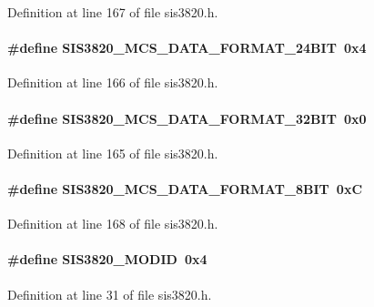 Definition at line 167 of file sis3820.h.
\paragraph[{SIS3820\_\-MCS\_\-DATA\_\-FORMAT\_\-24BIT}]{\setlength{\rightskip}{0pt plus 5cm}\#define SIS3820\_\-MCS\_\-DATA\_\-FORMAT\_\-24BIT~0x4}\hfill\label{sis3820_8h_a705e0893b268189b296f9a627473b006}


Definition at line 166 of file sis3820.h.
\paragraph[{SIS3820\_\-MCS\_\-DATA\_\-FORMAT\_\-32BIT}]{\setlength{\rightskip}{0pt plus 5cm}\#define SIS3820\_\-MCS\_\-DATA\_\-FORMAT\_\-32BIT~0x0}\hfill\label{sis3820_8h_aed2056b01f509efa255c9da7010480c1}


Definition at line 165 of file sis3820.h.
\paragraph[{SIS3820\_\-MCS\_\-DATA\_\-FORMAT\_\-8BIT}]{\setlength{\rightskip}{0pt plus 5cm}\#define SIS3820\_\-MCS\_\-DATA\_\-FORMAT\_\-8BIT~0xC}\hfill\label{sis3820_8h_a8f556820ba72a600cf97d54180b345f3}


Definition at line 168 of file sis3820.h.
\paragraph[{SIS3820\_\-MODID}]{\setlength{\rightskip}{0pt plus 5cm}\#define SIS3820\_\-MODID~0x4}\hfill\label{sis3820_8h_a56ba40d155d5ce25b6d43229f0ecf54a}


Definition at line 31 of file sis3820.h.

